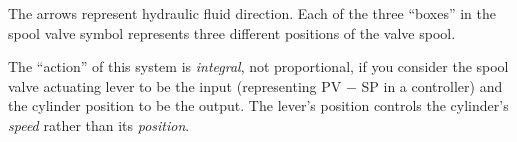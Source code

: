 





The arrows represent hydraulic fluid direction.  Each of the three ``boxes'' in the spool valve symbol represents three different positions of the valve spool.







The ``action'' of this system is {\it integral}, not proportional, if you consider the spool valve actuating lever to be the input (representing PV $-$ SP in a controller) and the cylinder position to be the output.  The lever's position controls the cylinder's {\it speed} rather than its {\it position}.




